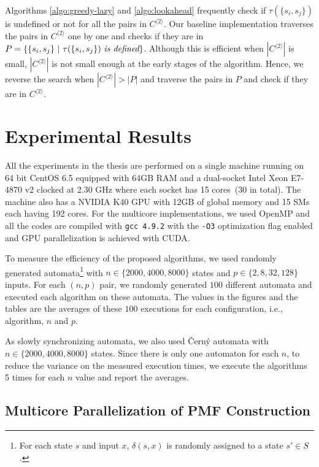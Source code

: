 \documentclass[12pt]{article}
\begin{document}
Algorithms \ref{algo:greedy-lazy} and \ref{algo:lookahead} frequently check if $\tau(\{ s_i,s_j \})$ is undefined or not for all the pairs in $C^{\langle 2 \rangle}$. Our baseline implementation traverses the pairs in $C^{\langle 2 \rangle}$ one by one and checks if they are in $P = \{ \{s_i, s_j \}\ |\ \tau(\{s_i, s_j \})~ \mbox{\em is defined} \}$. Although this is efficient when $|C^{\langle 2 \rangle}|$ is small, $|C^{\langle 2 \rangle}|$ is not small enough at the early stages of the algorithm. Hence, we reverse the search when $|C^{\langle 2 \rangle}| > |P|$ and traverse the pairs in $P$ and check if they are in $C^{\langle 2 \rangle}$.

\clearpage
\section{Experimental Results}
\label{sec:results}

All the experiments in the thesis are performed on a single machine running on 64 bit CentOS 6.5 equipped with 64GB RAM and a dual-socket Intel Xeon E7-4870 v2 clocked at 2.30 GHz where each socket  has 15 cores~(30 in total). The machine also has a NVIDIA K40 GPU with 12GB of global memory and 15 SMs each having 192 cores. For the multicore implementations, we used OpenMP and all the codes are compiled with {\tt gcc 4.9.2} with the {\tt -O3} optimization flag enabled and GPU parallelization is achieved with CUDA. 

To measure the efficiency of the proposed algorithms, we used randomly generated automata\footnote{For each state $s$ and input $x$, $\delta(s,x)$ is randomly assigned to a state $s' \in S$.} with $n  \in \{2000, 4000, 8000\}$ states and ${p \in \{2, 8, 32, 128\}}$ inputs. For each $(n, p)$ pair, we randomly generated $100$ different automata and executed each algorithm on these automata. The values in the figures and the tables are the averages of these $100$ executions for each configuration, i.e., algorithm, $n$ and $p$. 

As slowly synchronizing automata, we also used \v{C}ern\'y automata with $n  \in \{2000, 4000, 8000\}$ states. Since there is only one automaton for each $n$, to reduce the variance on the measured execution times, we execute the algorithms 5 times for each $n$ value and report the averages.

\subsection{Multicore Parallelization of PMF Construction}
\end{document}
